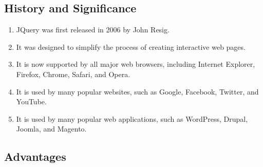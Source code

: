 \documentclass[11pt]{article}
\begin{document}
\subsection{History and Significance}

\begin{enumerate}
    \item JQuery was first released in 2006 by John Resig.
    \item It was designed to simplify the process of creating interactive web pages.
    \item It is now supported by all major web browsers, including Internet Explorer, Firefox, Chrome, Safari, and Opera.
    \item It is used by many popular websites, such as Google, Facebook, Twitter, and YouTube.
    \item It is used by many popular web applications, such as WordPress, Drupal, Joomla, and Magento.
\end{enumerate}

\subsection{Advantages}
\end{document}

